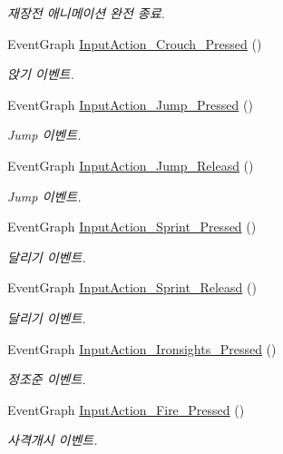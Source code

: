 \begin{DoxyCompactItemize}
\begin{DoxyCompactList}\small\item\em 재장전 애니메이션 완전 종료. \end{DoxyCompactList}\item 
Event\+Graph \hyperlink{class_player___person_a9800183b485ccf5c0c74a481bd9c05ac}{Input\+Action\+\_\+\+Crouch\+\_\+\+Pressed} ()
\begin{DoxyCompactList}\small\item\em 앉기 이벤트. \end{DoxyCompactList}\item 
Event\+Graph \hyperlink{class_player___person_a369de9678e64b2e1a1c720855a1d8357}{Input\+Action\+\_\+\+Jump\+\_\+\+Pressed} ()
\begin{DoxyCompactList}\small\item\em Jump 이벤트. \end{DoxyCompactList}\item 
Event\+Graph \hyperlink{class_player___person_a08614e238304288b7b9eb72a315a3767}{Input\+Action\+\_\+\+Jump\+\_\+\+Releasd} ()
\begin{DoxyCompactList}\small\item\em Jump 이벤트. \end{DoxyCompactList}\item 
Event\+Graph \hyperlink{class_player___person_a9fb9f094c0ef83ed87e477e7e91f27e3}{Input\+Action\+\_\+\+Sprint\+\_\+\+Pressed} ()
\begin{DoxyCompactList}\small\item\em 달리기 이벤트. \end{DoxyCompactList}\item 
Event\+Graph \hyperlink{class_player___person_a5b3eac9c463f0abddf7de0052bbee6b1}{Input\+Action\+\_\+\+Sprint\+\_\+\+Releasd} ()
\begin{DoxyCompactList}\small\item\em 달리기 이벤트. \end{DoxyCompactList}\item 
Event\+Graph \hyperlink{class_player___person_ab4e2db16a377d6ebd2c229ae2d7bce16}{Input\+Action\+\_\+\+Ironsights\+\_\+\+Pressed} ()
\begin{DoxyCompactList}\small\item\em 정조준 이벤트. \end{DoxyCompactList}\item 
Event\+Graph \hyperlink{class_player___person_a912c134fda9c35f9bd78d20cf76a7b67}{Input\+Action\+\_\+\+Fire\+\_\+\+Pressed} ()
\begin{DoxyCompactList}\small\item\em 사격개시 이벤트. \end{DoxyCompactList}\item 

\end{DoxyCompactItemize}
